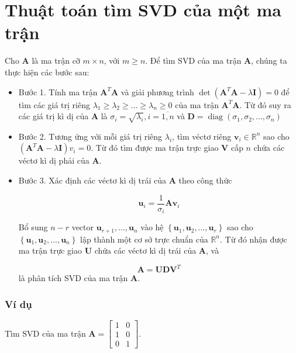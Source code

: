 \documentclass[14pt,oneside,a4paper]{report}
\numberwithin{equation}{section}
\begin{document}
\section{Thuật toán tìm SVD của một ma trận}
Cho $\mathbf{A}$ là ma trận cỡ $m \times n$, với $m \geq n$. Để tìm $\mathrm{SVD}$ của ma trận $\mathbf{A}$, chúng ta thực hiện các bước sau:
\begin{itemize}

\item Bước 1. Tính ma trận $\mathbf{A}^{T} \mathbf{A}$ và giải phương trình $\operatorname{det}\left(\mathbf{A}^{T} \mathbf{A}-\lambda \mathbf{I}\right)=0$ để tìm các giá trị riêng $\lambda_{1} \geq \lambda_{2} \geq \ldots \geq \lambda_{n} \geq 0$ của ma trận $\mathbf{A}^{T} \mathbf{A}$. Từ đó suy ra các giá trị kì dị của $\mathbf{A}$ là $\sigma_{i}=\sqrt{\lambda_{i}}, i=\overline{1, n}$ và $\mathbf{D}=\operatorname{diag}\left(\sigma_{1}, \sigma_{2}, \ldots, \sigma_{n}\right)$

\item Bước 2. Tương ứng với mỗi giá trị riêng $\lambda_{i}$, tìm véctơ riêng $\mathbf{v}_{i} \in \mathbb{R}^{n}$ sao cho $\left(\mathbf{A}^{T} \mathbf{A}-\lambda \mathbf{I}\right) v_{i}=0$. Từ đó tìm được ma trận trực giao $\mathbf{V}$ cấp $n$ chứa các véctơ kì dị phải của $\mathbf{A}$.

\item Bước 3. Xác định các véctơ kì dị trái của $\mathbf{A}$ theo công thức

$$
\mathbf{u}_{i}=\frac{1}{\sigma_{i}} \mathbf{A} \mathbf{v}_{i}
$$

Bổ sung $n-r$ vector $\mathbf{u}_{r+1}, \ldots, \mathbf{u}_{n}$ vào hệ $\left\{\mathbf{u}_{1}, \mathbf{u}_{2}, \ldots, \mathbf{u}_{r}\right\}$ sao cho $\left\{\mathbf{u}_{1},\mathbf{u}_{2}, \ldots, \mathbf{u}_{n}\right\}$ lập thành một cơ sở trực chuẩn của $\mathbb{R}^{n}$. Từ đó nhận được ma trận trực giao $\mathbf{U}$ chứa các véctơ kì dị trái của $\mathbf{A}$, và

$$
\mathbf{A}=\mathbf{U D V}^{T}
$$
là phân tích SVD của ma trận $\mathbf{A}$.
\end{itemize}
\subsubsection{Ví dụ}

Tìm SVD của ma trận $\mathbf{A}=\left[\begin{array}{ll}1 & 0 \\ 1 & 0 \\ 0 & 1\end{array}\right]$.
\end{document}
